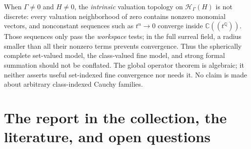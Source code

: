 \documentclass[11pt,letterpaper]{article}
\numberwithin{equation}{section}
\theoremstyle{definition}
\theoremstyle{remark}
\newcommand{\C}{\mathbb C}
\newcommand{\Q}{\mathbb Q}
\newcommand{\HH}[1]{\mathscr H_\Gamma(#1)}
\begin{document}
When $\Gamma\ne0$ and $H\ne0$, the \emph{intrinsic} valuation topology on
$\HH{H}$ is not discrete: every valuation neighborhood of zero contains
nonzero monomial vectors, and nonconstant sequences such as $t^n\to0$
converge inside $\C((t^\Q))$. Those sequences only pass the \emph{workspace}
tests; in the full surreal field, a radius smaller than all their nonzero
terms prevents convergence. Thus the spherically complete set-valued model,
the class-valued fine model, and strong formal summation should not be
conflated. The global operator theorem is algebraic; it neither asserts
useful set-indexed fine convergence nor needs it. No claim is made about
arbitrary class-indexed Cauchy families.

\section{The report in the collection, the literature, and open questions}
\label{hgeo:sec:provenance}
\end{document}
